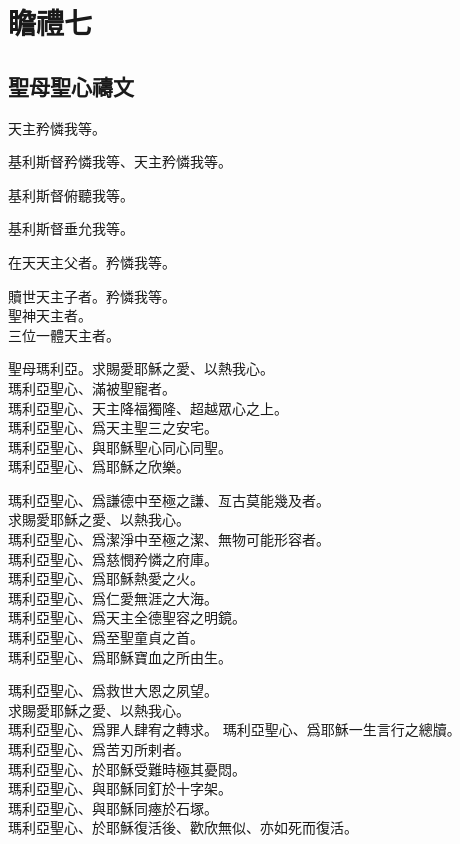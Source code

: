 \chapter[瞻禮七]{瞻禮七}
\section{聖母聖心禱文}
\versicle 天主矜憐我等。

\Response 基利斯督矜憐我等、天主矜憐我等。

\versicle 基利斯督俯聽我等。

\Response 基利斯督垂允我等。

\versicle 在天天主父者。\hfill \response 矜憐我等。

\versicle 贖世天主子者。\hfill \response 矜憐我等。\\
聖神天主者。\\
三位一體天主者。

\versicle 聖母瑪利亞。\hfill \response 求賜愛耶穌之愛、以熱我心。\\
瑪利亞聖心、滿被聖寵者。\\
瑪利亞聖心、天主降福獨隆、超越眾心之上。\\
瑪利亞聖心、爲天主聖三之安宅。\\
瑪利亞聖心、與耶穌聖心同心同聖。\\
瑪利亞聖心、爲耶穌之欣樂。

\versicle 瑪利亞聖心、爲謙德中至極之謙、亙古莫能幾及者。\\
\hfill \response 求賜愛耶穌之愛、以熱我心。\\
瑪利亞聖心、爲潔淨中至極之潔、無物可能形容者。\\
瑪利亞聖心、爲慈憫矜憐之府庫。\\
瑪利亞聖心、爲耶穌熱愛之火。\\
瑪利亞聖心、爲仁愛無涯之大海。\\
瑪利亞聖心、爲天主全德聖容之明鏡。\\
瑪利亞聖心、爲至聖童貞之首。\\
瑪利亞聖心、爲耶穌寶血之所由生。

\versicle 瑪利亞聖心、爲救世大恩之夙望。\\
\hfill \response 求賜愛耶穌之愛、以熱我心。\\
瑪利亞聖心、爲罪人肆宥之轉求。
瑪利亞聖心、爲耶穌一生言行之總牘。\\
瑪利亞聖心、爲苦刃所剌者。\\
瑪利亞聖心、於耶穌受難時極其憂悶。\\
瑪利亞聖心、與耶穌同釘於十字架。\\
瑪利亞聖心、與耶穌同瘞於石塚。\\
瑪利亞聖心、於耶穌復活後、歡欣無似、亦如死而復活。

